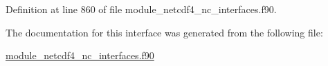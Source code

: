 Definition at line 860 of file module\+\_\+netcdf4\+\_\+nc\+\_\+interfaces.\+f90.



The documentation for this interface was generated from the following file\+:\begin{DoxyCompactItemize}
\item 
\hyperlink{module__netcdf4__nc__interfaces_8f90}{module\+\_\+netcdf4\+\_\+nc\+\_\+interfaces.\+f90}\end{DoxyCompactItemize}
